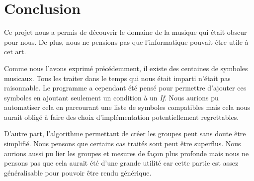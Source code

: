 \section{Conclusion}

Ce projet nous a permis de découvrir le domaine de la musique qui était obscur pour nous. De plus, nous ne pensions pas que l'informatique pouvait être utile à cet art.

\par
Comme nous l'avons exprimé précédemment, il existe des centaines de symboles musicaux. Tous les traiter dans le temps qui nous était imparti n'était pas raisonnable. Le programme a cependant été pensé pour permettre d'ajouter ces symboles en ajoutant seulement un condition à un \emph{If}. Nous aurions pu automatiser cela en parcourant une liste de symboles compatibles mais cela nous aurait obligé à faire des choix d'implémentation potentiellement regrettables.

\par
D'autre part, l'algorithme permettant de créer les groupes peut sans doute être simplifié. Nous pensons que certains cas traités sont peut être superflus. Nous aurions aussi pu lier les groupes et mesures de façon plus profonde mais nous ne pensons pas que cela aurait été d'une grande utilité car cette partie est assez généralisable pour pouvoir être rendu générique.
